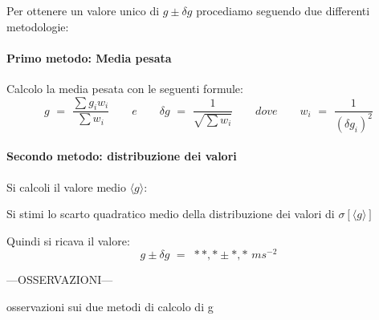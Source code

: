 Per ottenere un valore unico di $g \pm \delta g$ procediamo seguendo due differenti metodologie:

\paragraph{Primo metodo: Media pesata\\}

Calcolo la media pesata con le seguenti formule:
\begin{equation}
	g \,\, = \,\, \frac{\sum g_iw_i}{\sum w_i} \quad\quad e \quad\quad \delta g \,\, = \,\, \frac{1}{\sqrt{\sum w_i}} \quad\quad dove \quad\quad w_i \,\, = \,\, \frac{1}{(\delta g_i)^2}
\end{equation}

\paragraph{Secondo metodo: distribuzione dei valori\\}

Si calcoli il valore medio $\langle g\rangle$:

%
Si stimi lo scarto quadratico medio della distribuzione dei valori di $\sigma[\langle g\rangle]$

Quindi si ricava il valore:
\begin{equation}
	g \pm \delta g \,\, = \,\, \ast\ast,\ast \pm \ast,\ast \,\, ms^{-2}
\end{equation}


\begin{center}
	---OSSERVAZIONI---
	
	osservazioni sui due metodi di calcolo di g
\end{center}